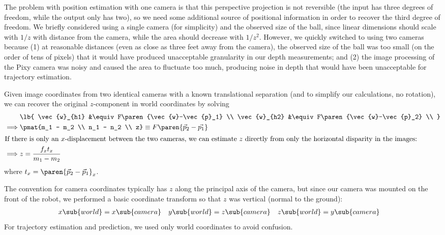 \documentclass[letterpaper, 11pt]{article}
\renewcommand{\v}[1]{\vec{#1}}
\begin{document}
The problem with position estimation with one camera is that this perspective projection is not reversible (the input has three degrees of freedom, while the output only has two), so we need some additional source of positional information in order to recover the third degree of freedom. We briefly considered using a single camera (for simplicity) and the observed size of the ball, since linear dimensions should scale with $1/z$ with distance from the camera, while the area should decrease with $1/z^2$. However, we quickly switched to using two cameras because (1) at reasonable distances (even as close as three feet away from the camera), the observed size of the ball was too small (on the order of tens of pixels) that it would have produced unacceptable granularity in our depth measurements; and (2) the image processing of the Pixy camera was noisy and caused the area to fluctuate too much, producing noise in depth that would have been unacceptable for trajectory estimation.

Given image coordinates from two identical cameras with a known translational separation (and to simplify our calculations, no rotation), we can recover the original $z$-component in world coordinates by solving
\begin{align*}
    &\lb{
        \v{w}_{h1} &\equiv F\paren{\v{w}-\v{p}_1} \\
        \v{w}_{h2} &\equiv F\paren{\v{w}-\v{p}_2} \\
    } \\
    \implies &\pmat{m_1 - m_2 \\ n_1 - n_2 \\ z} \equiv F\paren{\v{p}_2 - \v{p_1}} \\
    \intertext{If there is only an $x$-displacement between the two cameras, we can estimate $z$ directly from only the horizontal disparity in the images:}
    \implies &z = \frac{f_x t_x}{m_1 - m_2}
\end{align*}
where $t_x = \paren{\v{p}_{2} - \v{p}_{1}}_x$.

The convention for camera coordinates typically has $z$ along the principal axis of the camera, but since our camera was mounted on the front of the robot, we performed a basic coordinate transform so that $z$ was vertical (normal to the ground):
\begin{align*}
    x\sub{world} &= x\sub{camera} & y\sub{world} &= z\sub{camera} & z\sub{world} &= y\sub{camera}
\end{align*}
For trajectory estimation and prediction, we used only world coordinates to avoid confusion.
\end{document}
